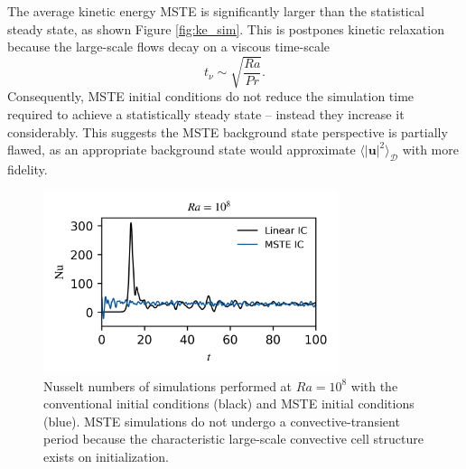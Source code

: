 \documentclass[reprint,amsmath,amssymb,aps]{revtex4-1}
\begin{document}
The average kinetic energy MSTE is significantly larger than the statistical steady state, as shown Figure \ref{fig:ke_sim}. 
This is postpones kinetic relaxation because the large-scale flows decay on a viscous time-scale
\begin{equation}
    t_{\nu} \sim \sqrt{\frac{Ra}{Pr}}. \nonumber
\end{equation}
Consequently, MSTE initial conditions do not reduce the simulation time required to achieve a statistically steady state -- instead they increase it considerably. This suggests the MSTE background state perspective is partially flawed, as an appropriate background state would approximate $\langle|\mathbf{u}|^2 \rangle_{\mathcal{D}}$ with more fidelity.
\begin{figure}
    \begin{minipage}{3.4in}
        \centering
        \includegraphics[width=3.4in]{sim_eq_nu.png}
        \caption{Nusselt numbers of simulations performed at $Ra = 10^8$ with the conventional initial conditions (black) and MSTE initial conditions (blue). 
        MSTE simulations do not undergo a convective-transient period because the characteristic large-scale convective cell structure exists on initialization.}
        \label{fig:nu_sim}
    \end{minipage}
\end{figure}
\end{document}

